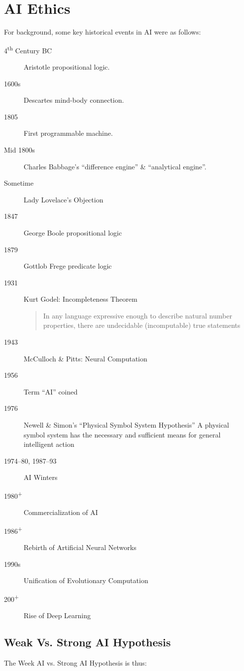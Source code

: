 %
%
%

\section{AI Ethics}
For background, some key historical events in AI were as follows:

\begin{description}
    \item[4\textsuperscript{th} Century BC] Aristotle propositional logic.
    \item[1600s] Descartes mind-body connection.
    \item[1805] First programmable machine.
    \item[Mid 1800s] Charles Babbage's ``difference engine'' & ``analytical engine''.
    \item[Sometime] Lady Lovelace's Objection
    \item[1847] George Boole propositional logic
    \item[1879] Gottlob Frege predicate logic
    \item[1931] Kurt Godel: Incompleteness Theorem
        \begin{quote}
            In any language expressive enough to describe natural number properties, there are undecidable (incomputable) true statements
        \end{quote}

    \item[1943] McCulloch \& Pitts: Neural Computation
    \item[1956] Term ``AI'' coined
    \item[1976] Newell \& Simon's ``Physical Symbol System Hypothesis'' A physical symbol system has the necessary and sufficient means for general intelligent action
    \item[1974--80, 1987--93] AI Winters
    \item[1980\textsuperscript{+}] Commercialization of AI
    \item[1986\textsuperscript{+}]  Rebirth of Artificial Neural Networks
    \item[1990s] Unification of Evolutionary Computation
    \item[200\textsuperscript{+}] Rise of Deep Learning
\end{description}

\subsection{Weak Vs. Strong AI Hypothesis}
The Week AI vs. Strong AI Hypothesis is thus:

